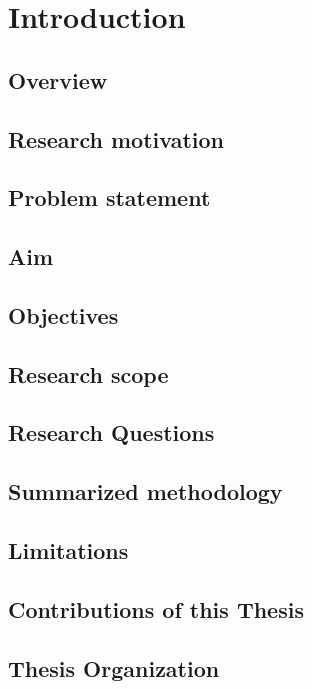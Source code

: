 \chapter{Introduction}
\label{chap:introduction}

\section{Overview}

\section{Research motivation}

\section{Problem statement}

\section{Aim}

\section{Objectives}

\section{Research scope}

\section{Research Questions}

\section{Summarized methodology}

\section{Limitations}

\section{Contributions of this Thesis}

\section{Thesis Organization}


